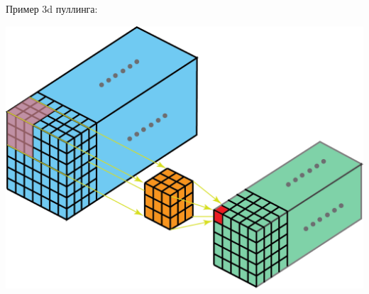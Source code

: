 Пример 3d пуллинга:
\begin{center}
    \includegraphics[scale=0.3]{images/3d_pooling.png}
\end{center}
 